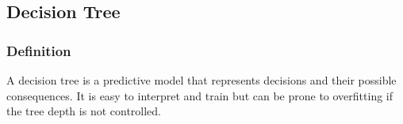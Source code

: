 \subsection{Decision Tree}
\subsubsection{Definition}

A decision tree is a predictive model that represents decisions and their possible consequences. It is easy to interpret and train but can be prone to overfitting if the tree depth is not controlled.

